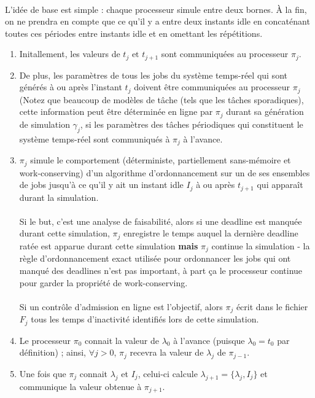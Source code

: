 \paragraph{} L'idée de base est simple : chaque processeur simule entre deux bornes. À la fin, on ne prendra en compte que ce qu'il y a entre deux instants idle en concaténant toutes ces périodes entre instants idle et en omettant les répétitions.
\begin{enumerate}
\item Initallement, les valeurs de $t_{j} \text{ et } t_{j+1}$ sont communiquées au processeur $\pi_{j}$.

\item De plus, les paramètres de tous les jobs du système temps-réel qui sont générés à ou après l'instant $t_{j}$ doivent être communiquées au processeur $\pi_{j}$ (Notez que beaucoup de modèles de tâche (tels que les tâches sporadiques), cette information peut être déterminée en ligne par $\pi_{j}$ durant sa génération de simulation $\gamma_{j}$, si les paramètres des tâches périodiques qui constituent le système temps-réel sont communiqués à $\pi_{j}$ à l'avance.

\item $\pi_{j}$ simule le comportement (déterministe, partiellement sans-mémoire et work-conserving) d'un algorithme d'ordonnancement sur un de ses ensembles de jobs jusqu'à ce qu'il y ait un instant idle $I_{j}$ à ou après $t_{j+1}$ qui apparaît durant la simulation.
\paragraph{} Si le but, c'est une analyse de faisabilité, alors si une deadline est manquée durant cette simulation, $\pi_{j}$ enregistre le temps auquel la dernière deadline ratée est apparue durant cette simulation \textbf{mais} $\pi_{j}$ continue la simulation - la règle d'ordonnancement exact utilisée pour ordonnancer les jobs qui ont manqué des deadlines n'est pas important, à part ça le processeur continue pour garder la propriété de work-conserving. 
\paragraph{}
Si un contrôle d'admission en ligne est l'objectif, alors $\pi_{j}$ écrit dans le fichier $F_{j}$ tous les temps d'inactivité identifiés lors de cette simulation.
\item Le processeur $\pi_{0}$ connait la valeur de $\lambda_{0}$ à l'avance (puisque $\lambda_{0} = t_{0}$ par définition) ; ainsi, $\forall j > 0$, $\pi_{j}$ recevra la valeur de $\lambda_{j}$ de $\pi_{j-1}$.
\item Une fois que $\pi_{j}$ connait $\lambda_{j}$ et $I_{j}$, celui-ci calcule $\lambda_{j+1} = \{\lambda_{j}, I_{j}\}$ et communique la valeur obtenue à $\pi_{j+1}$.
\end{enumerate}

